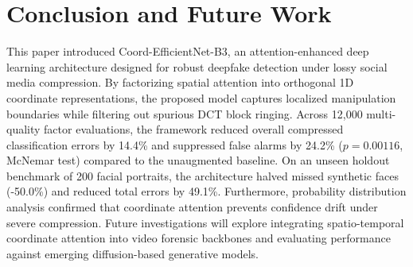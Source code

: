 \documentclass[conference]{IEEEtran}
\begin{document}
\section{Conclusion and Future Work}
This paper introduced Coord-EfficientNet-B3, an attention-enhanced deep learning architecture designed for robust deepfake detection under lossy social media compression. By factorizing spatial attention into orthogonal 1D coordinate representations, the proposed model captures localized manipulation boundaries while filtering out spurious DCT block ringing. Across 12,000 multi-quality factor evaluations, the framework reduced overall compressed classification errors by 14.4\% and suppressed false alarms by 24.2\% ($p = 0.00116$, McNemar test) compared to the unaugmented baseline. On an unseen holdout benchmark of 200 facial portraits, the architecture halved missed synthetic faces (-50.0\%) and reduced total errors by 49.1\%. Furthermore, probability distribution analysis confirmed that coordinate attention prevents confidence drift under severe compression. Future investigations will explore integrating spatio-temporal coordinate attention into video forensic backbones and evaluating performance against emerging diffusion-based generative models.
\end{document}
